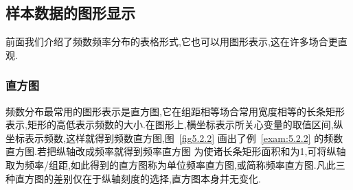 \subsection{样本数据的图形显示}
前面我们介绍了频数频率分布的表格形式,它也可以用图形表示,这在许多场合更直观.
\subsubsection{直方图}
频数分布最常用的图形表示是直方图,它在组距相等场合常用宽度相等的长条矩形表示,矩形的高低表示频数的大小.在图形上,横坐标表示所关心变量的取值区间,纵坐标表示频数,这样就得到频数直方图,图~\ref{fig5.2.2} 画出了例~\ref{exam:5.2.2} 的频数直方图.若把纵轴改成频率就得到频率直方图
为使诸长条矩形面积和为1,可将纵轴取为频率/组距,如此得到的直方图称为单位频率直方图,或简称频率直方图.凡此三种直方图的差别仅在于纵轴刻度的选择,直方图本身并无变化.
